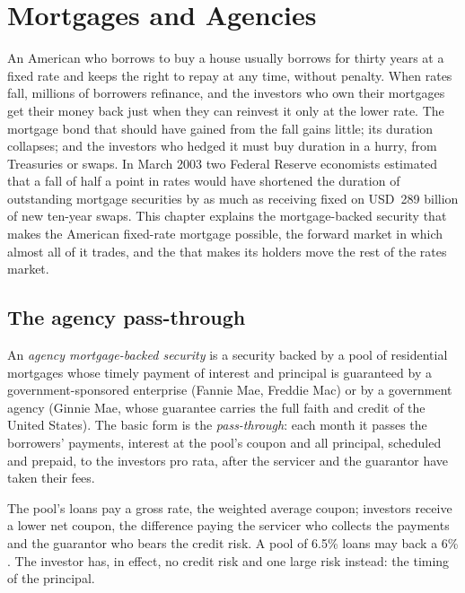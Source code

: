 \chapter{Mortgages and Agencies}\label{ch:m2:mortgages-and-agencies}

An American who borrows to buy a house usually borrows for thirty years at a
fixed rate and keeps the right to repay at any time, without penalty. When
rates fall, millions of borrowers refinance, and the investors who own their
mortgages get their money back just when they can reinvest it only at the lower
rate. The mortgage bond that should have gained from the fall gains little; its
duration collapses; and the investors who hedged it must buy duration in a
hurry, from Treasuries or swaps. In March 2003 two Federal Reserve economists
estimated that a fall of half a point in rates would have shortened the duration
of outstanding mortgage securities by as much as receiving fixed on USD~289
billion of new ten-year swaps. This chapter explains the mortgage-backed
security that makes the American fixed-rate mortgage possible, the forward
market in which almost all of it trades, and the  that makes
its holders move the rest of the rates market.

\section{The agency pass-through}

\begin{definition}\label{def:m2:mortgages-and-agencies:mbs}
An \emph{agency mortgage-backed security}
is a security backed by a pool of residential mortgages whose timely payment of
interest and principal is guaranteed by a government-sponsored enterprise
(Fannie Mae, Freddie Mac) or by a government agency (Ginnie Mae, whose guarantee
carries the full faith and credit of the United States). The basic form is the
\emph{pass-through}: each month it passes the borrowers'
payments, interest at the pool's coupon and all principal, scheduled and
prepaid, to the investors pro rata, after the servicer and the guarantor have
taken their fees.
\end{definition}

The pool's loans pay a gross rate, the weighted average coupon; investors
receive a lower net coupon, the difference paying the servicer who collects the
payments and the guarantor who bears the credit risk. A pool of 6.5\% loans may
back a 6\% . The investor has, in effect, no credit risk and one
large risk instead: the timing of the principal.

